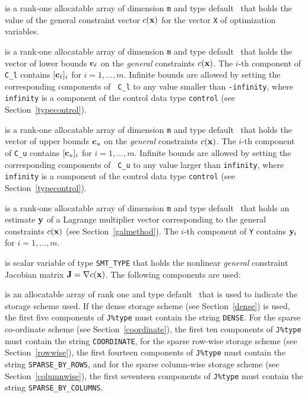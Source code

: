 \documentclass{galahad}
\newcommand{\Grad}{\nabla}
\begin{document}
\begin{description}
\begin{description}
\end{description}

 is a rank-one allocatable array of dimension {\tt m}
and type default \realdp\ that holds the value of the general
constraint vector $c({\mathbf{x}})$ for the vector {\tt X} of optimization variables.

 is a rank-one allocatable array of dimension {\tt m}
and type default \realdp\ that holds the vector of lower bounds
${\mathbf{c}}_\ell$ on the {\em general} constraints $c({\mathbf{x}})$. The $i$-th component of
{\tt C\_l} contains $[{\mathbf{c}}_\ell]_i$ for $i = 1, \ldots , m$.  Infinite
bounds are allowed by setting the corresponding components of {\tt
  C\_l} to any value smaller than {\tt -infinity}, where {\tt
  infinity} is a component of the control data type {\tt control} (see
Section~\ref{typecontrol}).

  is a rank-one allocatable array of dimension {\tt m}
and type default \realdp\ that holds the vector of upper bounds
${\mathbf{c}}_u$ on the {\em general} constraints $c({\mathbf{x}})$. The $i$-th component of
{\tt C\_u} contains $[{\mathbf{c}}_u]_i$ for $i = 1, \ldots , m$.  Infinite
bounds are allowed by setting the corresponding components of {\tt
  C\_u} to any value larger than {\tt infinity}, where {\tt
  infinity} is a component of the control data type {\tt control} (see
Section~\ref{typecontrol}).

 is a rank-one allocatable array of dimension {\tt m} and type
default \realdp\ that holds an estimate ${\mathbf{y}}$ of a Lagrange
multiplier vector corresponding to the general constraints $c({\mathbf{x}})$ (see Section~\ref{galmethod}).
The $i$-th component of {\tt Y} contains ${\mathbf{y}}_{i}$ for $i = 1,  \ldots , m$.


 is scalar variable of type {\tt SMT\_TYPE} that holds the
nonlinear {\em general} constraint Jacobian matrix $\bmJ = \Grad c(\bmx)$. The
following components are used:

\begin{description}

 is an allocatable array of rank one and type default
\character\ that
is used to indicate the storage scheme used. If the dense storage scheme
(see Section~\ref{dense}) is used,
the first five components of {\tt J\%type} must contain the
string {\tt DENSE}.
For the sparse co-ordinate scheme (see Section~\ref{coordinate}),
the first ten components of {\tt J\%type} must contain the
string {\tt COORDINATE},
for the sparse row-wise storage scheme (see Section~\ref{rowwise}),
the first fourteen components of {\tt J\%type} must contain the
string {\tt SPARSE\_BY\_ROWS},
and for the sparse column-wise storage scheme (see Section~\ref{columnwise}),
the first seventeen components of {\tt J\%type} must contain the
string {\tt SPARSE\_BY\_COLUMNS}.


\end{description}
\end{description}
\end{document}
